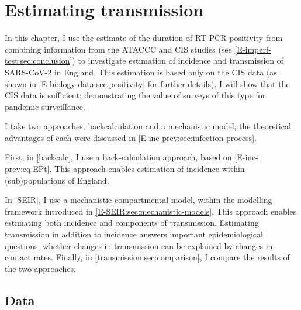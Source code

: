 \documentclass[thesis.tex]{subfiles}
\begin{document}
\ifSubfilesClassLoaded{
    \setcounter{chapter}{6}
}

\chapter{Estimating transmission} \label{transmission}


In this chapter, I use the estimate of the duration of RT-PCR positivity from combining information from the ATACCC and CIS studies (see \cref{E-imperf-test:sec:conclusion}) to investigate estimation of incidence and transmission of SARS-CoV-2 in England.
This estimation is based only on the CIS data (as shown in \cref{E-biology-data:sec:positivity} for further details).
I will show that the CIS data is sufficient; demonstrating the value of surveys of this type for pandemic surveillance.

I take two approaches, backcalculation and a mechanistic model, the theoretical advantages of each were discussed in \cref{E-inc-prev:sec:infection-process}.

First, in \cref{backcalc}, I use a back-calculation approach, based on \cref{E-inc-prev:eq:EPt}.
This approach enables estimation of incidence within (sub)populations of England.

In \cref{SEIR}, I use a mechanistic compartmental model, within the modelling framework introduced in \cref{E-SEIR:sec:mechanistic-models}.
This approach enables estimating both incidence and components of transmission.
Estimating transmission in addition to incidence answers important epidemiological questions, \eg whether changes in transmission can be explained by changes in contact rates.
Finally, in \cref{transmission:sec:comparison}, I compare the results of the two approaches.

\section{Data} \label{transmission:sec:data}

\end{document}
